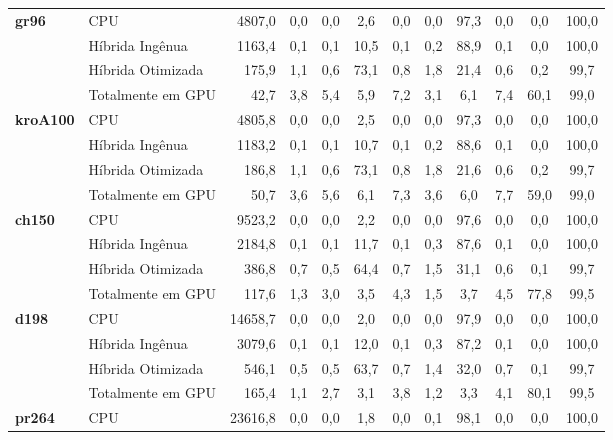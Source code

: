 \begin{tabeladensa}
\begin{longtable}[]{@{}llrccccccccc@{}}
  \midrule
  \textbf{gr96}      & CPU               & 4807,0   & 0,0 & 0,0 & 2,6  & 0,0  & 0,0 & 97,3 & 0,0  & 0,0  & 100,0 \\*
                     & Híbrida Ingênua   & 1163,4   & 0,1 & 0,1 & 10,5 & 0,1  & 0,2 & 88,9 & 0,1  & 0,0  & 100,0 \\*
                     & Híbrida Otimizada & 175,9    & 1,1 & 0,6 & 73,1 & 0,8  & 1,8 & 21,4 & 0,6  & 0,2  & 99,7  \\*
                     & Totalmente em GPU & 42,7     & 3,8 & 5,4 & 5,9  & 7,2  & 3,1 & 6,1  & 7,4  & 60,1 & 99,0  \\
  \midrule
  \textbf{kroA100}   & CPU               & 4805,8   & 0,0 & 0,0 & 2,5  & 0,0  & 0,0 & 97,3 & 0,0  & 0,0  & 100,0 \\*
                     & Híbrida Ingênua   & 1183,2   & 0,1 & 0,1 & 10,7 & 0,1  & 0,2 & 88,6 & 0,1  & 0,0  & 100,0 \\*
                     & Híbrida Otimizada & 186,8    & 1,1 & 0,6 & 73,1 & 0,8  & 1,8 & 21,6 & 0,6  & 0,2  & 99,7  \\*
                     & Totalmente em GPU & 50,7     & 3,6 & 5,6 & 6,1  & 7,3  & 3,6 & 6,0  & 7,7  & 59,0 & 99,0  \\
  \midrule
  \textbf{ch150}     & CPU               & 9523,2   & 0,0 & 0,0 & 2,2  & 0,0  & 0,0 & 97,6 & 0,0  & 0,0  & 100,0 \\*
                     & Híbrida Ingênua   & 2184,8   & 0,1 & 0,1 & 11,7 & 0,1  & 0,3 & 87,6 & 0,1  & 0,0  & 100,0 \\*
                     & Híbrida Otimizada & 386,8    & 0,7 & 0,5 & 64,4 & 0,7  & 1,5 & 31,1 & 0,6  & 0,1  & 99,7  \\*
                     & Totalmente em GPU & 117,6    & 1,3 & 3,0 & 3,5  & 4,3  & 1,5 & 3,7  & 4,5  & 77,8 & 99,5  \\
  \midrule
  \textbf{d198}      & CPU               & 14658,7  & 0,0 & 0,0 & 2,0  & 0,0  & 0,0 & 97,9 & 0,0  & 0,0  & 100,0 \\*
                     & Híbrida Ingênua   & 3079,6   & 0,1 & 0,1 & 12,0 & 0,1  & 0,3 & 87,2 & 0,1  & 0,0  & 100,0 \\*
                     & Híbrida Otimizada & 546,1    & 0,5 & 0,5 & 63,7 & 0,7  & 1,4 & 32,0 & 0,7  & 0,1  & 99,7  \\*
                     & Totalmente em GPU & 165,4    & 1,1 & 2,7 & 3,1  & 3,8  & 1,2 & 3,3  & 4,1  & 80,1 & 99,5  \\
  \midrule
  \textbf{pr264}     & CPU               & 23616,8  & 0,0 & 0,0 & 1,8  & 0,0  & 0,1 & 98,1 & 0,0  & 0,0  & 100,0 \\*

\end{longtable}
\end{tabeladensa}
